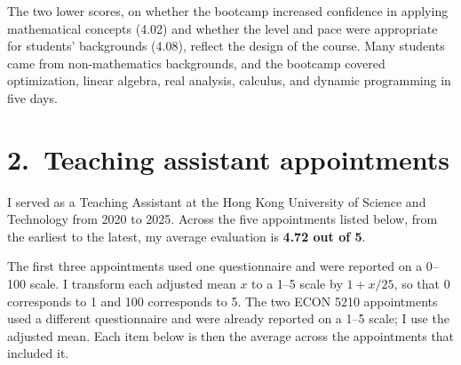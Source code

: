 \documentclass[11pt]{article}
\begin{document}
The two lower scores, on whether the bootcamp increased confidence in applying mathematical concepts (4.02) and whether the level and pace were appropriate for students' backgrounds (4.08), reflect the design of the course. Many students came from non-mathematics backgrounds, and the bootcamp covered optimization, linear algebra, real analysis, calculus, and dynamic programming in five days.

\section*{2.\ Teaching assistant appointments}

I served as a Teaching Assistant at the Hong Kong University of Science and Technology from 2020 to 2025. Across the five appointments listed below, from the earliest to the latest, my average evaluation is \textbf{4.72 out of 5}.

The first three appointments used one questionnaire and were reported on a 0--100 scale. I transform each adjusted mean \(x\) to a 1--5 scale by \(1 + x/25\), so that 0 corresponds to 1 and 100 corresponds to 5. The two ECON 5210 appointments used a different questionnaire and were already reported on a 1--5 scale; I use the adjusted mean. Each item below is then the average across the appointments that included it.
\end{document}
